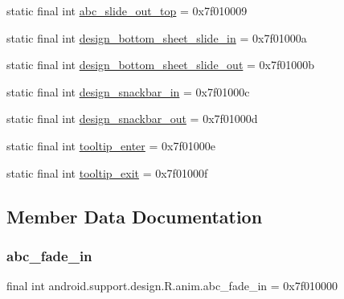 \begin{DoxyCompactItemize}
\item 
static final int \mbox{\hyperlink{classandroid_1_1support_1_1design_1_1R_1_1anim_add316245c738f2bbdc588fcd7b8673fe}{abc\+\_\+slide\+\_\+out\+\_\+top}} = 0x7f010009
\item 
static final int \mbox{\hyperlink{classandroid_1_1support_1_1design_1_1R_1_1anim_a25fb314be1be57716c26ce894d7a7154}{design\+\_\+bottom\+\_\+sheet\+\_\+slide\+\_\+in}} = 0x7f01000a
\item 
static final int \mbox{\hyperlink{classandroid_1_1support_1_1design_1_1R_1_1anim_a6e946b8501d7cb528bbf18f3d4a2da72}{design\+\_\+bottom\+\_\+sheet\+\_\+slide\+\_\+out}} = 0x7f01000b
\item 
static final int \mbox{\hyperlink{classandroid_1_1support_1_1design_1_1R_1_1anim_a9930bdac625232a9e03a5a9746dd8380}{design\+\_\+snackbar\+\_\+in}} = 0x7f01000c
\item 
static final int \mbox{\hyperlink{classandroid_1_1support_1_1design_1_1R_1_1anim_acf11f1948085305ee3c0caf4c4a043c3}{design\+\_\+snackbar\+\_\+out}} = 0x7f01000d
\item 
static final int \mbox{\hyperlink{classandroid_1_1support_1_1design_1_1R_1_1anim_a6d49bcc445f222e56e4f406f78a66f49}{tooltip\+\_\+enter}} = 0x7f01000e
\item 
static final int \mbox{\hyperlink{classandroid_1_1support_1_1design_1_1R_1_1anim_a8910053bfee4a8e697723bf6d813af70}{tooltip\+\_\+exit}} = 0x7f01000f
\end{DoxyCompactItemize}


\subsection{Member Data Documentation}
\mbox{\label{classandroid_1_1support_1_1design_1_1R_1_1anim_ad1aab55327ed71f67234994b071ab794}} 
\subsubsection{\texorpdfstring{abc\+\_\+fade\+\_\+in}{abc\_fade\_in}}
{\footnotesize\ttfamily final int android.\+support.\+design.\+R.\+anim.\+abc\+\_\+fade\+\_\+in = 0x7f010000\hspace{0.3cm}{\ttfamily [static]}}

